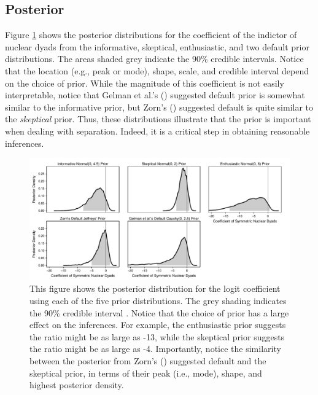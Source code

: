 \documentclass[12pt]{article}
\begin{document}
\subsection*{Posterior}

Figure \ref{fig:bm-posterior-density} shows the posterior distributions for the coefficient of the indictor of nuclear dyads from the informative, skeptical, enthusiastic, and two default prior distributions. The areas shaded grey indicate the 90\% credible intervals. Notice that the location (e.g., peak or mode), shape, scale, and credible interval depend on the choice of prior. While the magnitude of this coefficient is not easily interpretable, notice that Gelman et al.'s (\citeyear{Gelmanetal2008}) suggested default prior is somewhat similar to the informative prior, but Zorn's (\citeyear{Zorn2005}) suggested default is quite similar to the \emph{skeptical} prior. Thus, these distributions illustrate that the prior is important when dealing with separation. Indeed, it is a critical step in obtaining reasonable inferences.

\begin{figure}[H]
\begin{center}
\includegraphics[scale = .8]{figs/bm-posterior-density.pdf}
\caption{This figure shows the posterior distribution for the logit coefficient using each of the five prior distributions.  The grey shading indicates the 90\% credible interval . Notice that the choice of prior has a large effect on the inferences. For example, the enthusiastic prior suggests the ratio might be as large as -13, while the skeptical prior suggests the ratio might be as large as -4. Importantly, notice the similarity between the posterior from Zorn's (\citeyear{Zorn2005}) suggested default and the skeptical prior, in terms of their peak (i.e., mode), shape, and highest posterior density.}\label{fig:bm-posterior-density}
\end{center}
\end{figure}
\end{document}
